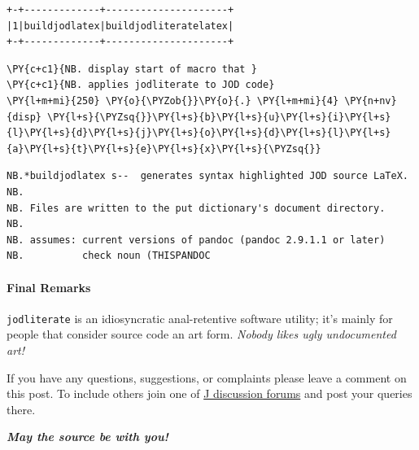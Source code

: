     \begin{Verbatim}[commandchars=\\\{\}]
+-+-------------+---------------------+
|1|buildjodlatex|buildjodliteratelatex|
+-+-------------+---------------------+
    \end{Verbatim}

    \begin{tcolorbox}[breakable, size=fbox, boxrule=1pt, pad at break*=1mm,colback=cellbackground, colframe=cellborder]
\begin{Verbatim}[commandchars=\\\{\}]
\PY{c+c1}{NB. display start of macro that }
\PY{c+c1}{NB. applies jodliterate to JOD code}
\PY{l+m+mi}{250} \PY{o}{\PYZob{}}\PY{o}{.} \PY{l+m+mi}{4} \PY{n+nv}{disp} \PY{l+s}{\PYZsq{}}\PY{l+s}{b}\PY{l+s}{u}\PY{l+s}{i}\PY{l+s}{l}\PY{l+s}{d}\PY{l+s}{j}\PY{l+s}{o}\PY{l+s}{d}\PY{l+s}{l}\PY{l+s}{a}\PY{l+s}{t}\PY{l+s}{e}\PY{l+s}{x}\PY{l+s}{\PYZsq{}}
\end{Verbatim}
\end{tcolorbox}

    \begin{Verbatim}[commandchars=\\\{\}]
NB.*buildjodlatex s--  generates syntax highlighted JOD source LaTeX.
NB.
NB. Files are written to the put dictionary's document directory.
NB.
NB. assumes: current versions of pandoc (pandoc 2.9.1.1 or later)
NB.          check noun (THISPANDOC
    \end{Verbatim}

    \hypertarget{final-remarks}{%
\paragraph{Final Remarks}\label{final-remarks}}

\texttt{jodliterate} is an idiosyncratic anal-retentive software
utility; it's mainly for people that consider source code an art form.
\emph{Nobody likes ugly undocumented art!}

If you have any questions, suggestions, or complaints please leave a
comment on this post. To include others join one of
\href{https://code.jsoftware.com/wiki/System/Forums}{J discussion
forums} and post your queries there.

\textbf{\emph{May the source be with you!}}

    
    
%
